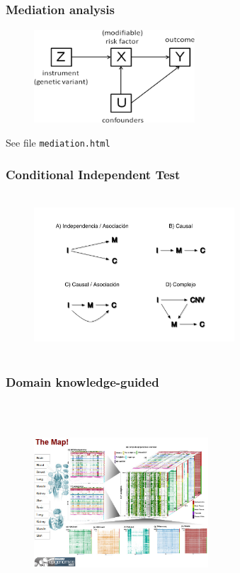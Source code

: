 \documentclass[10pt,xcolor=dvipsnames]{beamer}\usepackage[]{graphicx}\usepackage[]{color}
\begin{document}
\begin{frame}\frametitle{Mediation analysis}

\begin{figure}
  \includegraphics[height=3.5cm, width=6cm]{figures/mendelian_randomization.png}
\end{figure}

See file {\tt mediation.html}

\end{frame}


\begin{frame}\frametitle{Conditional Independent Test}

\begin{figure}
  \includegraphics[height=6cm, width=7.5cm]{figures/CIT.png}
\end{figure}

\end{frame}


\begin{frame}\frametitle{Domain knowledge-guided}

\begin{figure}
  \includegraphics[height=7.5cm, width=6.5cm]{figures/roadmap.jpg}
\end{figure}

\end{frame}
\end{document}
